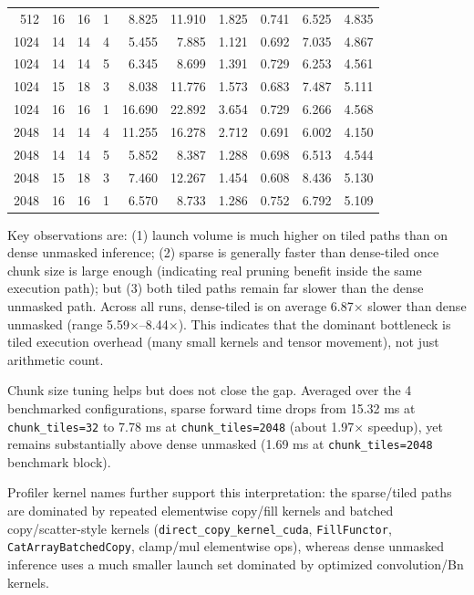 \begin{table}[t]
{\begin{tabular}{rrrrrrrrrr}
512 & 16 & 16 & 1 & 8.825 & 11.910 & 1.825 & 0.741 & 6.525 & 4.835 \\
1024 & 14 & 14 & 4 & 5.455 & 7.885 & 1.121 & 0.692 & 7.035 & 4.867 \\
1024 & 14 & 14 & 5 & 6.345 & 8.699 & 1.391 & 0.729 & 6.253 & 4.561 \\
1024 & 15 & 18 & 3 & 8.038 & 11.776 & 1.573 & 0.683 & 7.487 & 5.111 \\
1024 & 16 & 16 & 1 & 16.690 & 22.892 & 3.654 & 0.729 & 6.266 & 4.568 \\
2048 & 14 & 14 & 4 & 11.255 & 16.278 & 2.712 & 0.691 & 6.002 & 4.150 \\
2048 & 14 & 14 & 5 & 5.852 & 8.387 & 1.288 & 0.698 & 6.513 & 4.544 \\
2048 & 15 & 18 & 3 & 7.460 & 12.267 & 1.454 & 0.608 & 8.436 & 5.130 \\
2048 & 16 & 16 & 1 & 6.570 & 8.733 & 1.286 & 0.752 & 6.792 & 5.109 \\
\hline
\end{tabular}
}
\end{table}

Key observations are:
(1) launch volume is much higher on tiled paths than on dense unmasked inference;
(2) sparse is generally faster than dense-tiled once chunk size is large enough (indicating real pruning benefit inside the same execution path);
but
(3) both tiled paths remain far slower than the dense unmasked path.
Across all runs, dense-tiled is on average 6.87$\times$ slower than dense unmasked (range 5.59$\times$--8.44$\times$).
This indicates that the dominant bottleneck is tiled execution overhead (many small kernels and tensor movement), not just arithmetic count.

Chunk size tuning helps but does not close the gap.
Averaged over the 4 benchmarked configurations, sparse forward time drops from 15.32 ms at \texttt{chunk\_tiles=32}
to 7.78 ms at \texttt{chunk\_tiles=2048} (about 1.97$\times$ speedup),
yet remains substantially above dense unmasked (1.69 ms at \texttt{chunk\_tiles=2048} benchmark block).

Profiler kernel names further support this interpretation:
the sparse/tiled paths are dominated by repeated elementwise copy/fill kernels and batched copy/scatter-style kernels
(\texttt{direct\_copy\_kernel\_cuda}, \texttt{FillFunctor}, \texttt{CatArrayBatchedCopy}, clamp/mul elementwise ops),
whereas dense unmasked inference uses a much smaller launch set dominated by optimized convolution/Bn kernels.

